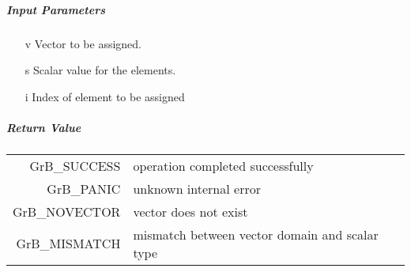 \subparagraph{Input Parameters}

\begin{itemize}
	\item[{\sf v}] Vector to be assigned.
	\item[{\sf s}] Scalar value for the elements.
	\item[{\sf i}] Index of element to be assigned
\end{itemize}

\subparagraph{Return Value}

\begin{tabular}{rl}
{\sf GrB\_SUCCESS}	& operation completed successfully \\
{\sf GrB\_PANIC}	& unknown internal error \\
{\sf GrB\_NOVECTOR}	& vector does not exist \\
{\sf GrB\_MISMATCH}	& mismatch between vector domain and scalar type \\
\end{tabular}
